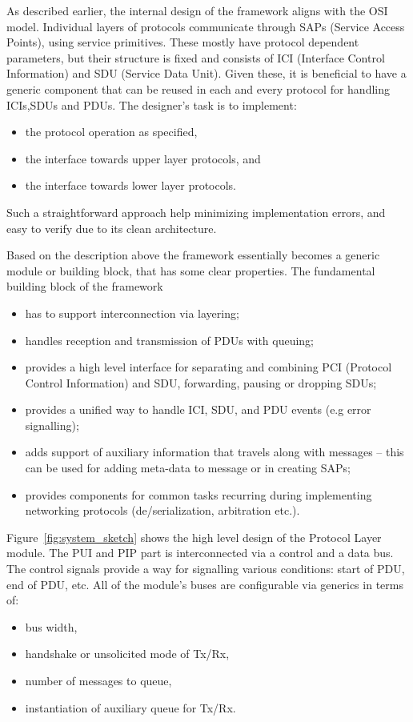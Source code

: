 \documentclass[conference]{IEEEtran}
\begin{document}
As described earlier, the internal design of the framework aligns with the OSI model. Individual layers of protocols
communicate through SAPs (Service Access Points), using service primitives.
These mostly have protocol dependent parameters, but their structure is fixed and consists of ICI (Interface Control
Information) and SDU (Service Data Unit). Given these, it is beneficial to have a generic component that can be reused
in each and every protocol for handling ICIs,SDUs and PDUs. The designer's task is to implement:
\begin{itemize}
    \renewcommand \labelitemi{--}
    \item the protocol operation as specified,
    \item the interface towards upper layer protocols, and
    \item the interface towards lower layer protocols.
\end{itemize}

Such a straightforward approach help minimizing implementation errors, and easy to verify due to its clean
architecture.

Based on the description above the framework essentially becomes a generic module or building block, that has some
clear properties. The fundamental building block of the framework

\begin{itemize}
    \renewcommand \labelitemi{--}
    \item has to support interconnection via layering;
    \item handles reception and transmission of PDUs with queuing;
    \item provides a high level interface for separating and combining PCI (Protocol Control Information) and SDU,
          forwarding, pausing or dropping SDUs;
    \item provides a unified way to handle ICI, SDU, and PDU events (e.g error signalling);
    \item adds support of auxiliary information that travels along with messages -- this can be used for adding
          meta-data to message or in creating SAPs;
    \item provides components for common tasks recurring during implementing networking protocols
          (de/serialization, arbitration etc.).
\end{itemize}

Figure~\ref{fig:system_sketch} shows the high level design of the Protocol Layer module. The PUI and PIP part is
interconnected via a control and a data bus. The control signals provide a way for signalling various conditions: start
of PDU, end of PDU, etc. All of the module's buses are configurable via generics in terms of:
\begin{itemize}
    \renewcommand \labelitemi{--}
    \item bus width,
    \item handshake or unsolicited mode of Tx/Rx,
    \item number of messages to queue,
    \item instantiation of auxiliary queue for Tx/Rx.
\end{itemize}
\end{document}
